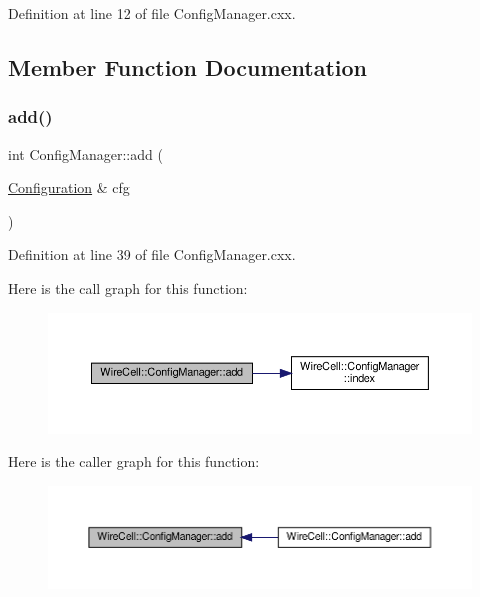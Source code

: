 Definition at line 12 of file Config\+Manager.\+cxx.



\subsection{Member Function Documentation}
\mbox{\label{class_wire_cell_1_1_config_manager_a7e1e1b91cdecd2c5464d2b8bf422d329}} 
\subsubsection{\texorpdfstring{add()}{add()}\hspace{0.1cm}{\footnotesize\ttfamily [1/2]}}
{\footnotesize\ttfamily int Config\+Manager\+::add (\begin{DoxyParamCaption}\item[{\hyperlink{namespace_wire_cell_a9f705541fc1d46c608b3d32c182333ee}{Configuration} \&}]{cfg }\end{DoxyParamCaption})}



Definition at line 39 of file Config\+Manager.\+cxx.

Here is the call graph for this function\+:
\nopagebreak
\begin{figure}[H]
\begin{center}
\leavevmode
\includegraphics[width=350pt]{class_wire_cell_1_1_config_manager_a7e1e1b91cdecd2c5464d2b8bf422d329_cgraph}
\end{center}
\end{figure}
Here is the caller graph for this function\+:
\nopagebreak
\begin{figure}[H]
\begin{center}
\leavevmode
\includegraphics[width=350pt]{class_wire_cell_1_1_config_manager_a7e1e1b91cdecd2c5464d2b8bf422d329_icgraph}
\end{center}
\end{figure}
\mbox{\label{class_wire_cell_1_1_config_manager_a8c96b5d7ab755d24a7dc9d9c2ea6cf4b}} 
